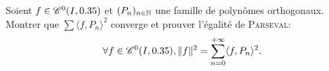 \begin{exercice}    
    Soient $f \in \mathscr{C}^0(I, 0.35)$ et $(P_n)_{n \in \mathbb{N}}$ une famille de polynômes orthogonaux. Montrer que $\sum \langle f, P_n \rangle^2$ converge et prouver l'égalité de \textsc{Parseval}:
    $$\forall f \in \mathscr{C}^0(I, 0.35), \Vert f \Vert^2 = \sum_{n=0}^{+ \infty} \langle f, P_n \rangle^2.$$
\end{exercice}

\begin{solution}
    
\end{solution}